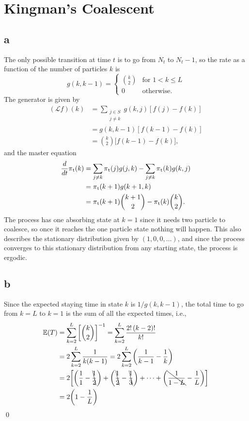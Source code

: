 \documentclass[12pt, twoside, a4paper]{article}
\newcommand{\Gen}{\mathcal{L}}
\begin{document}
\section{Kingman's Coalescent}
\subsection*{a}
The only possible transition at time $t$ is to go from $N_t$ to $N_t - 1$, so the rate as a function of the number of particles $k$ is
\[g(k, k-1) = 
\begin{cases}
	{k \choose 2} & \text{for } 1 < k \le L\\
	0 & \text{otherwise.}
\end{cases}
\]
The generator is given by 
\begin{align*}
(\Gen f)(k) &= \sum_{\substack{j \in S \\ j \neq k}} g(k, j)[f(j) - f(k)]\\
&= g(k, k-1)[f(k-1)-f(k)]\\
&= {k \choose 2} \bigg[f(k-1) - f(k) \bigg]\text{,}
\end{align*}
and the master equation
\begin{align*}
\frac{d}{dt}\pi \textsubscript{t} (k) &= \sum_{j \neq k} \pi \textsubscript{t} (j) g(j, k) - \sum_{j \neq k} \pi \textsubscript{t} (k) g(k, j)\\
&= \pi \textsubscript{t} (k+1) g(k+1, k) \\
&= \pi \textsubscript{t} (k + 1) {k+1 \choose 2} - \pi \textsubscript{t} (k) {k \choose 2} \text{.}
\end{align*}
The process has one absorbing state at $k = 1$ since it needs two particle to coalesce, so once it reaches the one particle state nothing will happen. This also describes the stationary distribution given by $(1, 0, 0, \dots)$, and since the process converges to this stationary distribution from any starting state, the process is ergodic. 

\subsection*{b}
Since the expected staying time in state $k$ is $1/g(k, k-1)$, the total time to go from $k = L$ to $k = 1$ is the sum of all the expected times, i.e.,
\begin{align*}
\mathbb{E}(T) 
&= \sum_{k = 2}^{L} \bigg[{k \choose 2} \bigg] ^{-1}
= \sum_{k=2}^{L} \frac{2! \, (k-2)!}{k!}\\
&= 2 \sum_{k = 2}^{L} \frac{1}{k(k-1)}
= 2 \sum_{k = 2}^{L} \bigg( \frac{1}{k-1} - \frac{1}{k} \bigg)\\
&= 2 \bigg[ \bigg( \frac{1}{1} - \bcancel{\frac{1}{2}} \bigg)
		   +\bigg( \bcancel{\frac{1}{2}} -  \bcancel{\frac{1}{3}} \bigg)
		   + \dots
		   +\bigg(  \bcancel{\frac{1}{1-L}} - \frac{1}{L} \bigg) \bigg]\\
&= 2 \bigg( 1 - \frac{1}{L} \bigg) 
\end{align*}
\qed
\end{document}
